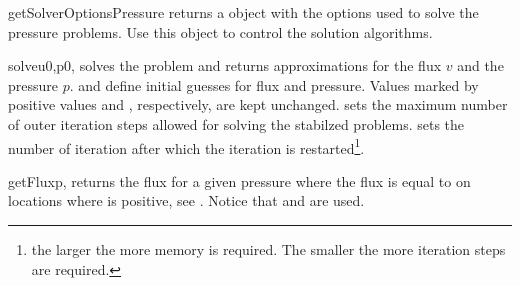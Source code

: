\begin{methoddesc}[DarcyFlow]{getSolverOptionsPressure}{}
returns a \SolverOptions object with the options used to solve the pressure
problems.
Use this object to control the solution algorithms.
\end{methoddesc}

\begin{methoddesc}[DarcyFlow]{solve}{u0,p0, }
solves the problem and returns approximations for the flux $v$ and the pressure $p$.
 and  define initial guesses for flux and pressure.
Values marked by positive values  and
, respectively, are kept unchanged.
 sets the maximum number of outer iteration steps allowed for solving the stabilzed 
problems.  sets the number of iteration after which the 
iteration is restarted\footnote{the larger  the more memory is required. The smaller
 the more iteration steps are required.}.
\end{methoddesc}

\begin{methoddesc}[DarcyFlow]{getFlux}{p, }
returns the flux for a given pressure  where the flux is equal to 
on locations where  is positive,  see .
Notice that  and  are used.
\end{methoddesc}




